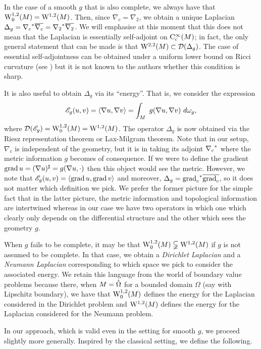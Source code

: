 \documentclass[a4paper, 12pt]{amsart}
\begin{document}
In the case of a smooth $g$ that is also complete, we
always have that $\SobH[0]{1}(M) = \SobH{1}(M)$. 
Then, since $\nabla_c = \nabla_2$, we obtain 
a unique Laplacian $\Delta_g = \adj{\nabla_c} \close{\nabla_c} = \adj{\nabla_2}\close{\nabla_2}$.
We will emphasise at this moment that this does not mean that 
the Laplacian is essentially self-adjoint on $\Ck[c]{\infty}(M)$; in 
fact, the only general statement that can be made is that
$\SobH{2}(M) \subset \dom(\Delta_g)$. The 
case of essential self-adjointness can
be obtained under a uniform lower bound on Ricci
curvature (see \cite{BDensity}) but it
is not known to the authors whether this condition is sharp.

It is also useful to obtain $\Delta_g$ via its ``energy''. 
That is,  we consider the expression 
$$\sE_g(u,v) = \inprod{\nabla u, \nabla v} = \int_M\ g(\nabla u, \nabla v)\ d\omega_g,$$
where $\dom(\sE_g) = \SobH[0]{1}(M) = \SobH{1}(M)$.
The operator $\Delta_g$ is now obtained via the Riesz representation theorem
or Lax-Milgram theorem.
Note that in our setup, $\nabla_c$ is independent of the geometry,
but it is in taking its adjoint $\adj{\nabla_c}$ where the
metric information $g$ becomes of consequence. If we were
to define the gradient $\grad u =  (\nabla u)^\sharp = g(\nabla u, \cdot)$
then this object would see the metric. However,
we note that 
$\sE_g(u,v) = \inprod{\grad u, \grad v}$
and moreover, $\Delta_g = \adj{\grad_c} \close{\grad_c}$, 
so it does not matter which definition we pick.
We prefer the former picture for the
simple fact that in the latter picture, the metric information
and topological information are intertwined whereas 
in our case we have two operators in which one which clearly only depends
on the differential structure and the other which sees the geometry $g$.

When $g$ fails to be complete, it may be that  
$\SobH[0]{1}(M) \subsetneqq  \SobH{1}(M)$
if $g$ is not assumed to be complete. 
In that case, we obtain a \emph{Dirichlet Laplacian} and  a \emph{Neumann 
Laplacian} corresponding to which space we pick 
to consider the associated energy.
We retain this language from the world of boundary 
value problems because there, when $M = \interior\Omega$
for a bounded domain $\Omega$ (say with Lipschitz boundary), we have that
$\SobH[0]{1}(M)$ defines the energy for
the Laplacian considered in the Dirichlet problem
and $\SobH{1}(M)$ defines the energy 
for the Laplacian considered for the Neumann problem.

In our approach, which is valid even in the setting
for smooth $g$, we proceed slightly more generally. 
Inspired by the classical setting, we define
the following.
 
\end{document}
